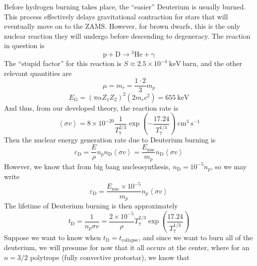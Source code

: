 \documentclass[10pt]{article}
\numberwithin{equation}{section}
\newcommand{\avg}[1]{\left\langle#1\right\rangle}
\begin{document}
  Before hydrogen burning takes place, the ``easier'' Deuterium is
  usually burned. This process effectively delays gravitational
  contraction for stars that will eventually move on to the
  ZAMS. However, for brown dwarfs, this is the only nuclear reaction
  they will undergo before descending to degeneracy. The reaction in
  question is
  \begin{equation}
    \label{eq:163}
    \mathrm{p+D\to {}^3He+\gamma}
  \end{equation}
  The ``stupid factor'' for this reaction is $S\approx 2.5\times
  10^{-4}\ \mathrm{keV\ barn}$, and the other relevant quantities are
  \begin{equation}
    \label{eq:311}
    \mu=m_r=\frac{1\cdot 2}{3}m_p
  \end{equation}
  \begin{equation}
    \label{eq:312}
    E_\mathrm{G}=\left(\pi\alpha
      Z_1Z_2\right)^2\left(2m_rc^2\right)=655\ \mathrm{keV}
  \end{equation}
  And thus, from our developed theory, the reaction rate is
  \begin{equation}
    \label{eq:313}
    \avg{\sigma v}=8\times
    10^{-20}\frac{1}{T_7^{2/3}}\exp\left(-\frac{17.24}{T_7^{1/3}}\right)\
    \mathrm{cm^{3}\ s^{-1}}
  \end{equation}
  Then the nuclear energy generation rate due to Deuterium burning is
  \begin{equation}
    \label{eq:314}
    \varepsilon_\mathrm{D}=\frac{E}{\rho}n_pn_\mathrm{D}\avg{\sigma
      v}=\frac{E_{\mathrm{nuc}}}{m_p}n_\mathrm{D}\avg{\sigma v}
  \end{equation}
  However, we know that from big bang nucleosynthesis,
  $n_\mathrm{D}=10^{-5}n_p$, so we may write
  \begin{equation}
    \label{eq:315}
    \varepsilon_{\mathrm{D}}=\frac{E_{\mathrm{nuc}}\times
      10^{-5}}{m_p}n_p\avg{\sigma v}
  \end{equation}
  The lifetime of Deuterium burning is then approximately
  \begin{equation}
    \label{eq:316}
    t_{\mathrm{D}}=\frac{1}{n_p\sigma v}=\frac{2\times
      10^{-5}}{\rho}T_7^{2/3}\exp\left(\frac{17.24}{T_7^{1/3}}\right)
  \end{equation}
  Suppose we want to know when $t_\mathrm{D}=t_{\mathrm{collapse}}$,
  and since we want to burn all of the deuterium, we will presume for
  now that it all occurs at the center, where for an $n=3/2$ polytrope
  (fully convective protostar), we know that
\end{document}
